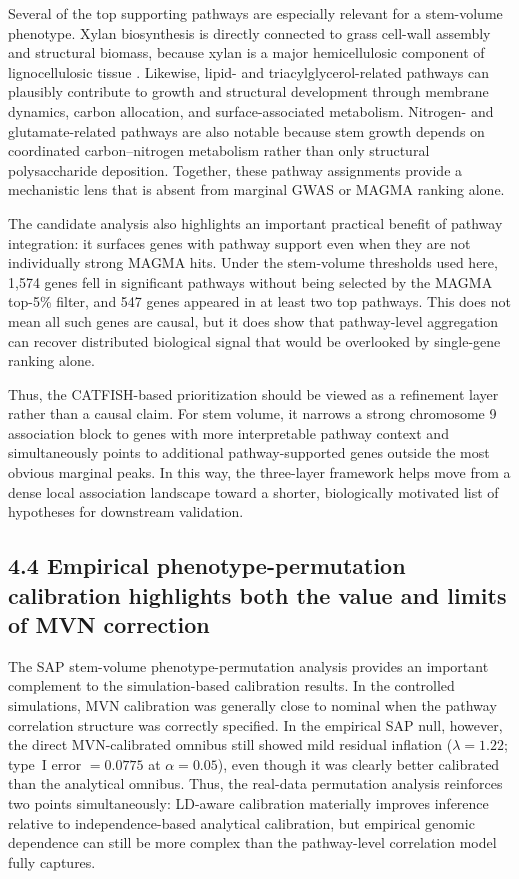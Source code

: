 \documentclass[unnumsec,webpdf,contemporary,large]{oup-authoring-template}%
\theoremstyle{thmstyleone}%
\theoremstyle{thmstyletwo}%
\theoremstyle{thmstylethree}%
\begin{document}
Several of the top supporting pathways are especially relevant for a stem-volume phenotype. Xylan biosynthesis is directly connected to grass cell-wall assembly and structural biomass, because xylan is a major hemicellulosic component of lignocellulosic tissue \citep{Dodd2009,Basit2019}. Likewise, lipid- and triacylglycerol-related pathways can plausibly contribute to growth and structural development through membrane dynamics, carbon allocation, and surface-associated metabolism. Nitrogen- and glutamate-related pathways are also notable because stem growth depends on coordinated carbon--nitrogen metabolism rather than only structural polysaccharide deposition. Together, these pathway assignments provide a mechanistic lens that is absent from marginal GWAS or MAGMA ranking alone.

The candidate analysis also highlights an important practical benefit of pathway integration: it surfaces genes with pathway support even when they are not individually strong MAGMA hits. Under the stem-volume thresholds used here, 1,574 genes fell in significant pathways without being selected by the MAGMA top-5\% filter, and 547 genes appeared in at least two top pathways. This does not mean all such genes are causal, but it does show that pathway-level aggregation can recover distributed biological signal that would be overlooked by single-gene ranking alone.

Thus, the CATFISH-based prioritization should be viewed as a refinement layer rather than a causal claim. For stem volume, it narrows a strong chromosome 9 association block to genes with more interpretable pathway context and simultaneously points to additional pathway-supported genes outside the most obvious marginal peaks. In this way, the three-layer framework helps move from a dense local association landscape toward a shorter, biologically motivated list of hypotheses for downstream validation.

\subsection{4.4 Empirical phenotype-permutation calibration highlights both the value and limits of MVN correction}

The SAP stem-volume phenotype-permutation analysis provides an important complement to the simulation-based calibration results. In the controlled simulations, MVN calibration was generally close to nominal when the pathway correlation structure was correctly specified. In the empirical SAP null, however, the direct MVN-calibrated omnibus still showed mild residual inflation (\(\lambda = 1.22\); type~I error \(= 0.0775\) at \(\alpha=0.05\)), even though it was clearly better calibrated than the analytical omnibus. Thus, the real-data permutation analysis reinforces two points simultaneously: LD-aware calibration materially improves inference relative to independence-based analytical calibration, but empirical genomic dependence can still be more complex than the pathway-level correlation model fully captures.
\end{document}
